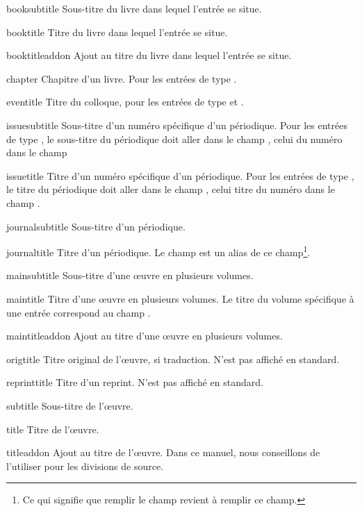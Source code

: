 \begin{choix}
	\item[booksubtitle]Sous-titre du livre dans lequel l'entrée se situe. 
   	\item[booktitle] Titre du livre dans lequel l'entrée se situe. 		
   	\item[booktitleaddon] Ajout au titre du livre dans lequel l'entrée se situe. 
   	\item[chapter] Chapitre d'un livre. Pour les entrées de type .	
   	\item[eventitle] Titre du colloque, pour les entrées de type  et .
   	\item[issuesubtitle] Sous-titre d'un numéro spécifique d'un périodique. 	Pour les entrées de type , le sous-titre du périodique doit aller dans le champ , celui du numéro dans le champ 		
   	\item[issuetitle] Titre d'un numéro spécifique d'un périodique. Pour les entrées de type , le titre du périodique doit aller dans le champ , celui titre du numéro dans le champ .		
   	\item[journalsubtitle] Sous-titre d'un périodique.							
   	\item[journaltitle] Titre d'un périodique. Le champ  est un alias de ce champ\footnote{Ce qui signifie que remplir le champ  revient à remplir ce champ.}.				
   	\item[mainsubtitle] Sous-titre d'une œuvre en plusieurs volumes.			
   	\item[maintitle] Titre d'une œuvre en plusieurs volumes. Le titre du volume spécifique à une entrée correspond au champ .						
   	\item[maintitleaddon]  Ajout au titre d'une œuvre en plusieurs volumes.		
   	\item[origtitle] Titre original de l'œuvre, si traduction. N'est pas affiché en standard. 
   	\item[reprinttitle] Titre d'un reprint. N'est pas affiché en standard.	
   	\item[subtitle] Sous-titre de l'œuvre.									
   	\item[title] Titre de l'œuvre.									
   	\item[titleaddon] Ajout au titre de l'œuvre. Dans ce manuel, nous conseillons de l'utiliser pour les divisions de source.
\end{choix}


